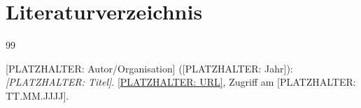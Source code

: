 \chapter*{Literaturverzeichnis}

\begin{thebibliography}{99}

[PLATZHALTER: Autor/Organisation] ([PLATZHALTER: Jahr]):
\emph{[PLATZHALTER: Titel]}.
\url{[PLATZHALTER: URL]},
Zugriff am [PLATZHALTER: TT.MM.JJJJ].

\end{thebibliography}
